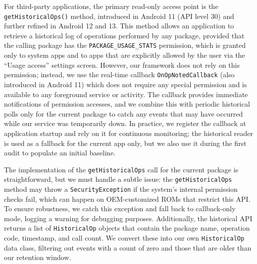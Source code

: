 For third-party applications, the primary read-only access point is the \texttt{getHistoricalOps()} method, introduced in Android 11 (API level 30) and further refined in Android 12 and 13. This method allows an application to retrieve a historical log of operations performed by any package, provided that the calling package has the \texttt{PACKAGE\_USAGE\_STATS} permission, which is granted only to system apps and to apps that are explicitly allowed by the user via the ``Usage access'' settings screen. However, our framework does not rely on this permission; instead, we use the real-time callback \texttt{OnOpNotedCallback} (also introduced in Android 11) which does not require any special permission and is available to any foreground service or activity. The callback provides immediate notifications of permission accesses, and we combine this with periodic historical polls only for the current package to catch any events that may have occurred while our service was temporarily down. In practice, we register the callback at application startup and rely on it for continuous monitoring; the historical reader is used as a fallback for the current app only, but we also use it during the first audit to populate an initial baseline.

The implementation of the \texttt{getHistoricalOps} call for the current package is straightforward, but we must handle a subtle issue: the \texttt{getHistoricalOps} method may throw a \texttt{SecurityException} if the system's internal permission checks fail, which can happen on OEM-customized ROMs that restrict this API. To ensure robustness, we catch this exception and fall back to callback-only mode, logging a warning for debugging purposes. Additionally, the historical API returns a list of \texttt{HistoricalOp} objects that contain the package name, operation code, timestamp, and call count. We convert these into our own \texttt{HistoricalOp} data class, filtering out events with a count of zero and those that are older than our retention window.

